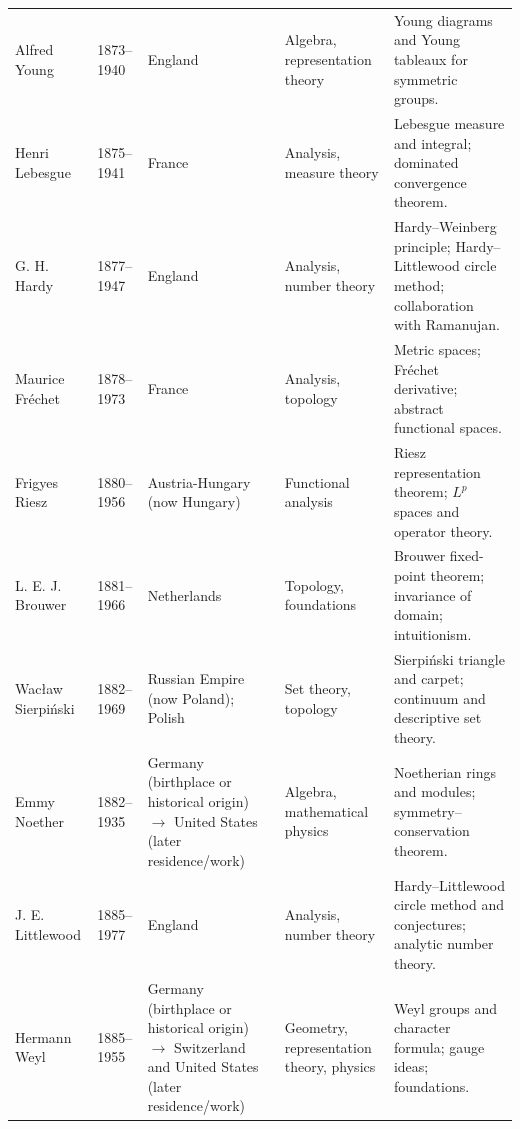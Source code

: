 {\begin{longtable}{@{}L{0.145\textwidth}L{0.09\textwidth}L{0.225\textwidth}L{0.14\textwidth}L{0.30\textwidth}@{}}
        Alfred Young
        & 1873--1940
        & England
        & Algebra, representation theory
        & Young diagrams and Young tableaux for symmetric groups. \\

        Henri Lebesgue
        & 1875--1941
        & France
        & Analysis, measure theory
        & Lebesgue measure and integral; dominated convergence theorem. \\

        G. H. Hardy
        & 1877--1947
        & England
        & Analysis, number theory
        & Hardy--Weinberg principle; Hardy--Littlewood circle method;
          collaboration with Ramanujan. \\

        Maurice Fréchet
        & 1878--1973
        & France
        & Analysis, topology
        & Metric spaces; Fréchet derivative; abstract functional spaces. \\

        Frigyes Riesz
        & 1880--1956
        & Austria-Hungary (now Hungary)
        & Functional analysis
        & Riesz representation theorem; $L^p$ spaces and operator theory. \\

        L. E. J. Brouwer
        & 1881--1966
        & Netherlands
        & Topology, foundations
        & Brouwer fixed-point theorem; invariance of domain; intuitionism. \\

        Wacław Sierpiński
        & 1882--1969
        & Russian Empire (now Poland); Polish
        & Set theory, topology
        & Sierpiński triangle and carpet; continuum and descriptive set theory. \\

        Emmy Noether
        & 1882--1935
        & Germany (birthplace or historical origin) \(\to\) United States (later residence/work)
        & Algebra, mathematical physics
        & Noetherian rings and modules; symmetry--conservation theorem. \\

        J. E. Littlewood
        & 1885--1977
        & England
        & Analysis, number theory
        & Hardy--Littlewood circle method and conjectures; analytic number
          theory. \\

        Hermann Weyl
        & 1885--1955
        & Germany (birthplace or historical origin) \(\to\) Switzerland and United States (later residence/work)
        & Geometry, representation theory, physics
        & Weyl groups and character formula; gauge ideas; foundations. \\


\end{longtable}}
